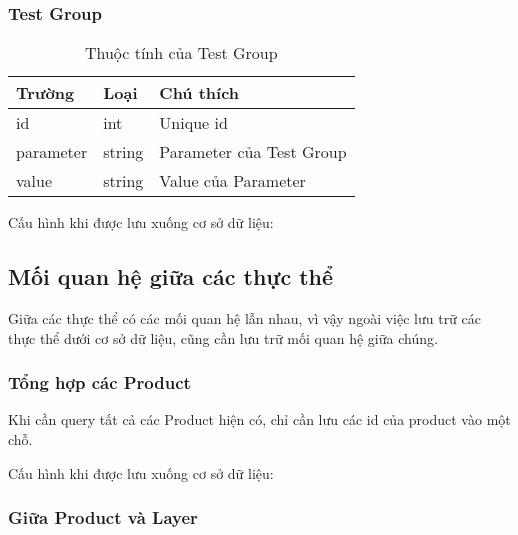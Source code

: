 \subsubsection{Test Group}

\begin{table}[H]
	\centering
	\begin{tabular}{|l|l|l|}
		\hline
		Trường    & Loại   & Chú thích                \\ \hline
		id        & int    & Unique id                \\ \hline
		parameter & string & Parameter của Test Group \\ \hline
		value     & string & Value của Parameter      \\ \hline
	\end{tabular}
	\caption{Thuộc tính của Test Group}
\end{table}

Cấu hình khi được lưu xuống cơ sở dữ liệu:

\begin{itemize}
\end{itemize}

\subsection{Mối quan hệ giữa các thực thể}

Giữa các thực thể có các mối quan hệ lẫn nhau, vì vậy ngoài việc lưu trữ các thực thể dưới
cơ sở dữ liệu, cũng cần lưu trữ mối quan hệ giữa chúng.

\subsubsection{Tổng hợp các Product}

Khi cần query tất cả các Product hiện có, chỉ cần lưu các id của product vào một chỗ.

Cấu hình khi được lưu xuống cơ sở dữ liệu:

\begin{itemize}
\end{itemize}

\subsubsection{Giữa Product và Layer}

